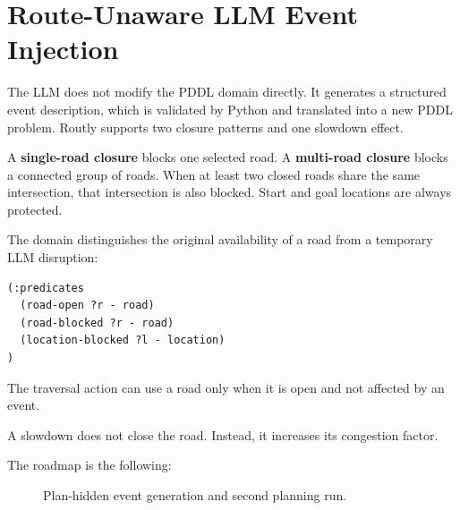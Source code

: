 \documentclass[10pt]{article}
\begin{document}
\section{Route-Unaware LLM Event Injection}



The LLM does not modify the PDDL domain directly. It generates a structured
event description, which is validated by Python and translated into a new PDDL
problem. Routly supports two closure patterns and one slowdown effect.

A \textbf{single-road closure} blocks one selected road. A
\textbf{multi-road closure} blocks a connected group of roads. When at least
two closed roads share the same intersection, that intersection is also
blocked. Start and goal locations are always protected.

The domain distinguishes the original availability of a road from a temporary
LLM disruption:

\begin{lstlisting}
(:predicates
  (road-open ?r - road)
  (road-blocked ?r - road)
  (location-blocked ?l - location)
)
\end{lstlisting}

The traversal action can use a road only when it is open and not affected by an
event.


A slowdown does not close the road. Instead, it increases its congestion
factor.

The roadmap is the following: 

\begin{figure}[H]
\centering
{}
\caption{Plan-hidden event generation and second planning run.}
\label{fig:llm-protocol}
\end{figure}
\end{document}
